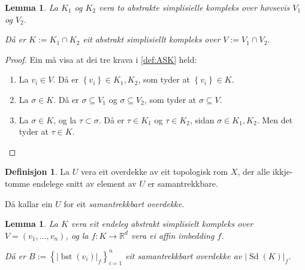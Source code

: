 \documentclass[a4paper, 12pt, norsk]{article}
\theoremstyle{plain}
\newtheorem{lemma}[theorem]{Lemma}
\theoremstyle{definition}
\newtheorem{definition}[theorem]{Definisjon}
\newcommand{\Rb}{\mathbb{R}}
\newcommand{\intersect}{ \mathop{\cap}\limits }
\newcommand{\gr}[1]{ \lvert #1 \rvert } %
\newcommand{\set}[1]{ \left\{ #1 \right\} } %
\DeclareMathOperator{\Sd}{Sd} %
\DeclareMathOperator{\bst}{bst} %
\begin{document}
\begin{lemma} \label{thm:snitt-av-ASK-er-ASK}
	La \( K_1 \) og \( K_2 \) vera to abstrakte simplisielle kompleks over høvsevis \( V_1 \) og \( V_2 \). 
	
	Då er \( K := K_1 \intersect K_2 \) eit abstrakt simplisiellt kompleks over \( V := V_1 \intersect V_2 \).
\end{lemma}

\begin{proof}
	Ein må visa at dei tre krava i \autoref{def:ASK} held:
	\begin{enumerate}
		\item La \( v_i \in V \). Då er \( \set{v_i} \in K_1, K_2 \), som tyder at \( \set{v_i} \in K \).
  		\item La \( \sigma \in K \). Då er \( \sigma \subseteq V_1 \) og \( \sigma \subseteq V_2 \), som tyder at \( \sigma \subseteq V \).
    	\item La \( \sigma \in K \), og la \( \tau \subset \sigma \). Då er \( \tau \in K_1 \) og \( \tau \in K_2 \), sidan \( \sigma \in K_1, K_2 \). Men det tyder at \( \tau \in K \). \qedhere
	\end{enumerate}
\end{proof}

\begin{definition}
	La \( U \) vera eit overdekke av eit topologisk rom \( X \), der alle ikkje-tomme endelege snitt av element av \( U \) er samantrekkbare. 
	
	Då kallar ein \( U \) for eit \emph{samantrekkbart overdekke}.
\end{definition}

\begin{lemma} \label{thm:bst-good}
	La \( K \) vera eit endeleg abstrakt simplisielt kompleks over \( V = (v_1, \dots, v_n) \), og la \( f: K \to \Rb^d \) vera ei affin imbedding \( f \). 
	
	Då er \( B := \set{\gr{\bst(v_i)}_f}_{i=1}^{n} \) eit samantrekkbart overdekke av \( \gr{\Sd(K)}_f \).
\end{lemma}
\end{document}
